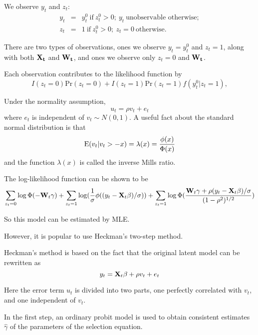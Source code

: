 We observe $y_t$ and $z_t$:
\begin{eqnarray}
 y_t & = & y_t^0 \ \mbox{if} \ z_t^0 > 0;  \ y_t \ \mbox{unobservable otherwise}; \nonumber \\
 z_t & = & 1  \ \mbox{if} \ z_t^0 > 0; \ z_t=0 \ \mbox{otherwise}.
\end{eqnarray}

There are two types of observations, ones we observe $y_t=y_t^0$
and $z_t=1$, along with both $\bf X_t$ and $\bf W_t$, and ones we
observe only $z_t=0$ and $\bf W_t$.

Each observation contributes to the likelihood function by
\begin{equation}
I(z_t=0)\mbox{Pr}(z_t=0)+I(z_t=1)\mbox{Pr}(z_t=1)f(y_t^0 | z_t=1),
\end{equation}

Under the normality assumption,
\begin{equation}
u_t=\rho v_t+e_t
\end{equation}
where $e_t$ is independent of $v_t \sim N(0,1)$.  A useful fact
about the standard normal distribution is that
\begin{equation}
{\rm E} (v_t | v_t>-x)=\lambda (x) =\frac{\phi(x)}{\Phi(x)}
\end{equation}
and the function $\lambda(x)$ is called the inverse Mills ratio.

The log-likelihood function can be shown to be
\begin{equation}
\sum_{z_t=0} \log \Phi(-{\bf W}_t \gamma)+\sum_{z_t=1}
\log(\frac{1}{\sigma} \phi ((y_t - {\bf X}_t \beta)/\sigma)) +
\sum_{z_t=1} \log \Phi (\frac{{\bf W}_t \gamma+\rho (y_t-{\bf X}_t
\beta)/\sigma}{(1-\rho^2)^{1/2}})
\end{equation}

So this model can be estimated by MLE.

However, it is popular to use Heckman's two-step method.

Heckman's method is based on the fact that the original latent
model can be rewritten as
\begin{equation}
y_t={\bf X}_t \beta + \rho v_t +e_t
\end{equation}

Here the error term $u_t$ is divided into two parts, one
perfectly correlated with $v_t$, and one independent of $v_t$.

In the first step, an ordinary probit model is used to obtain
consistent estimates $\hat \gamma$ of the parameters of the
selection equation.


